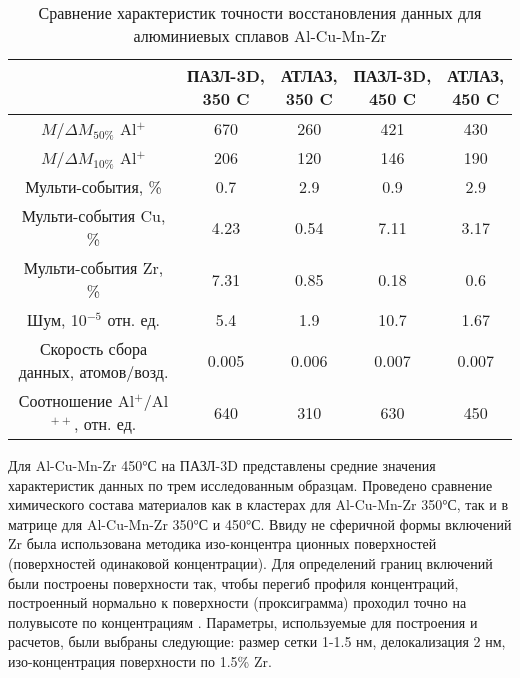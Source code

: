 \begin{table} [htbp]
	\centering
	\caption{Сравнение характеристик точности восстановления данных для алюминиевых сплавов Al-Cu-Mn-Zr}
	\label{tab:paramsAPPLEvsATLAS}
	\begin{SingleSpace}
		\begin{tabular} {| c | c | c | c | c |}
			\hline
			    {} & \thead{ПАЗЛ-3D, \\350 \textdegree C} & \thead{АТЛАЗ, \\350 \textdegree C} & \thead{ПАЗЛ-3D, \\450 \textdegree C} & \thead{АТЛАЗ, \\450 \textdegree C} \\ \hline
			$M/\Delta M_{50\%}$ Al$^+$ & 670  & 260  & 421  & 430               \\ \hline
			$M/\Delta M_{10\%}$ Al$^+$ & 206  & 120  & 146  & 190               \\ \hline
			Мульти-события, \%         & 0.7  & 2.9  & 0.9  & 2.9               \\ \hline
			Мульти-события Cu, \%      & 4.23 & 0.54 & 7.11 & 3.17              \\ \hline
			Мульти-события Zr, \%      & 7.31 & 0.85 & 0.18 & 0.6               \\ \hline
			Шум, 10$^{-5}$ отн. ед. & 5.4   & 1.9   & 10.7  & 1.67  \\ \hline
			Скорость сбора данных, атомов/возд.        & 0.005 & 0.006 & 0.007 & 0.007 \\ \hline
			Соотношение Al$^+$/Al$^{++}$, отн. ед.    & 640   & 310   & 630   & 450   \\ \hline
		\end{tabular}
	\end{SingleSpace}
\end{table}

Для Al-Cu-Mn-Zr 450°С на ПАЗЛ-3D представлены средние значения характеристик данных по трем исследованным образцам. Проведено сравнение химического состава материалов как в кластерах для Al-Cu-Mn-Zr 350°С, так и в матрице для Al-Cu-Mn-Zr 350°С и 450°С. Ввиду не сферичной формы включений Zr была использована методика изо-концентра ционных поверхностей (поверхностей одинаковой концентрации). Для определений границ включений были построены поверхности так, чтобы перегиб профиля концентраций, построенный нормально к поверхности (проксиграмма) проходил точно на полувысоте по концентрациям \cite{Hellman07}. Параметры, используемые для построения и расчетов, были выбраны следующие: размер сетки 1-1.5 нм, делокализация 2 нм, изо-концентрация поверхности по 1.5\% Zr. 

